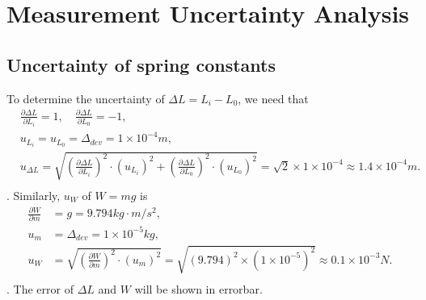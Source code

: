 \section{Measurement Uncertainty Analysis}
\subsection{Uncertainty of spring constants}
    To determine the uncertainty of $\Delta L=L_i-L_0$, we need that
    \[
    \begin{split}
        &\frac{\partial \Delta L}{\partial L_i}=1,\quad \frac{\partial \Delta L}{\partial L_0}=-1,\\
        &u_{L_i}=u_{L_0}=\Delta_{dev}=1\times10^{-4}m,\\
        &u_{\Delta L}=\sqrt{(\frac{\partial \Delta L}{\partial L_i})^2\cdot (u_{L_i})^2+(\frac{\partial \Delta L}{\partial L_0})^2\cdot (u_{L_0})^2}=\sqrt{2}\times 1\times10^{-4}\approx1.4\times10^{-4}m.\\
    \end{split}
    \].
    Similarly, $u_{W}$ of $W=mg$ is
    \[
    \begin{split}
        \frac{\partial W}{\partial m}&=g=9.794kg\cdot m/s^2,\\
        u_m&=\Delta_{dev}=1\times10^{-5}kg,\\
        u_{W}&=\sqrt{(\frac{\partial W}{\partial m})^2\cdot (u_m)^2}=\sqrt{(9.794)^2\times (1\times10^{-5})^2}\approx 0.1\times10^{-3}N.\\
    \end{split}
    \].
    The error of $\Delta L$ and $W$ will be shown in errorbar.
